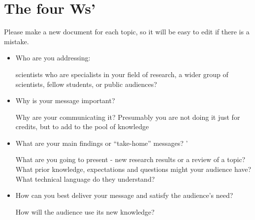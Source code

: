 \section*{The four Ws'} %
Please make a new document for each topic, so it will be easy to edit if there is a mistake.

\begin{itemize}
\item Who are you addressing: 

scientists who are specialists in your field
of research, a wider group of scientists, fellow students, or public
audiences?
\item Why is your message important? 

Why are your communicating it?
Presumably you are not doing it just for credits, but to add to the
pool of knowledge
\item What are your main findings or “take-home” messages? '

What are
you going to present - new research results or a review of a topic?
What prior knowledge, expectations and questions might your
audience have? What technical language do they understand?
\item How can you best deliver your message and satisfy the audience’s need? 

How will the audience use its new knowledge?

\end{itemize}